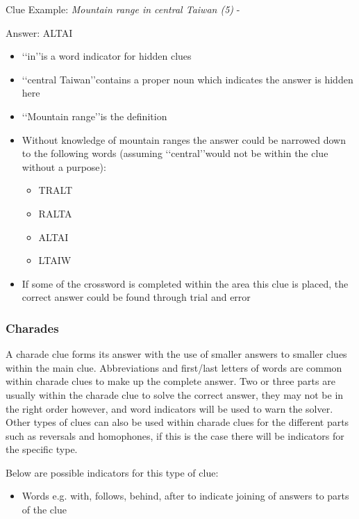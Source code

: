 Clue Example: \emph{Mountain range in central Taiwan (5)} - \citep{shuchiHidden08}

Answer: ALTAI 

\begin{itemize}
	\item \lq\lq in\rq\rq is a word indicator for hidden clues 
	\item \lq\lq central Taiwan\rq\rq contains a proper noun which indicates the answer is hidden here 
 	\item \lq\lq Mountain range\rq\rq is the definition 
 	\item Without knowledge of mountain ranges the answer could be narrowed down to the following words (assuming \lq\lq central\rq\rq would not be within the clue without a purpose): 
	\begin{itemize}
		\item TRALT 
		\item RALTA 
		\item ALTAI 
		\item LTAIW
	\end{itemize} 
\item If some of the crossword is completed within the area this clue is placed, the correct answer could be found through trial and error 
\end{itemize}

\subsubsection{Charades}

A charade clue forms its answer with the use of smaller answers to smaller clues within the main clue. Abbreviations and first/last letters of words are common within charade clues to make up the complete answer. Two or three parts are usually within the charade clue to solve the correct answer, they may not be in the right order however, and word indicators will be used to warn the solver. Other types of clues can also be used within charade clues for the different parts such as reversals and homophones, if this is the case there will be indicators for the specific type.  

Below are possible indicators for this type of clue: 
\begin{itemize}
	\item Words e.g. with, follows, behind, after to indicate joining of answers to parts of the clue 
\\
\end{itemize}

